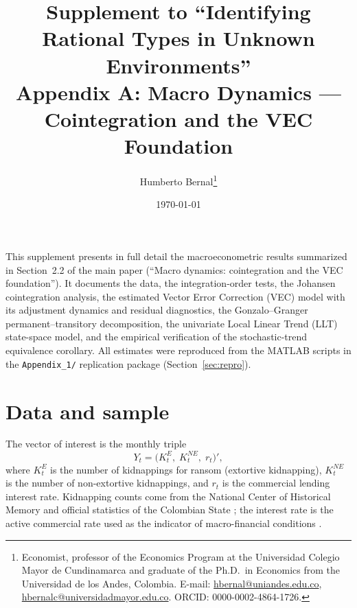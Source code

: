 \documentclass[12pt]{article}
\numberwithin{equation}{section}
\numberwithin{table}{section}
\theoremstyle{definition}
\newcommand{\KE}{K^{E}}
\newcommand{\KNE}{K^{NE}}
\begin{document}
\title{Supplement to ``Identifying Rational Types in Unknown Environments''\\
Appendix A: Macro Dynamics --- Cointegration and the VEC Foundation}
\author{Humberto Bernal\thanks{Economist, professor of the Economics Program at the Universidad Colegio Mayor de Cundinamarca and graduate of the Ph.D.\ in Economics from the Universidad de los Andes, Colombia. E-mail: \href{mailto:hbernal@uniandes.edu.co}{hbernal@uniandes.edu.co}, \href{mailto:hbernalc@universidadmayor.edu.co}{hbernalc@universidadmayor.edu.co}. ORCID: 0000-0002-4864-1726.}}
\date{\today}
\maketitle

\newpage

\noindent
This supplement presents in full detail the macroeconometric results
summarized in Section~2.2 of the main paper (``Macro dynamics: cointegration
and the VEC foundation''). It documents the data, the
integration-order tests, the Johansen cointegration analysis, the estimated
Vector Error Correction (VEC) model with its adjustment dynamics and residual
diagnostics, the Gonzalo--Granger permanent--transitory decomposition, the
univariate Local Linear Trend (LLT) state-space model, and the empirical
verification of the stochastic-trend equivalence corollary. All estimates
were reproduced from the MATLAB scripts in the \texttt{Appendix\_1/}
replication package (Section~\ref{sec:repro}).

\section{Data and sample}
\label{sec:data}

The vector of interest is the monthly triple
\begin{equation}
Y_t = \bigl(\KE_t,\; \KNE_t,\; r_t\bigr)',
\label{eq:vector}
\end{equation}
where $\KE_t$ is the number of kidnappings for ransom (extortive kidnapping),
$\KNE_t$ is the number of non-extortive kidnappings, and $r_t$ is the
commercial lending interest rate. Kidnapping counts come from the National
Center of Historical Memory \citep{CNMH2013,cnmh_datos} and official
statistics of the Colombian State \citep{mindefensa_stats}; the interest rate
is the active commercial rate used as the indicator of macro-financial
conditions \citep{Masih1995,Suarez_2025}.
\end{document}
